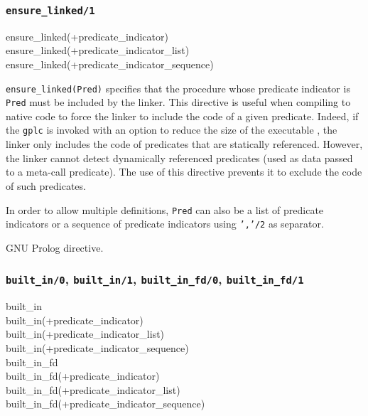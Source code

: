 \subsubsection{\texttt{ensure\_linked/1}}

\begin{TemplatesOneCol}
ensure\_linked(+predicate\_indicator)\\
ensure\_linked(+predicate\_indicator\_list)\\
ensure\_linked(+predicate\_indicator\_sequence)

\end{TemplatesOneCol}

\Description

\texttt{ensure\_linked(Pred)} specifies that the procedure
whose predicate indicator is \texttt{Pred} must be included by the linker.
This directive is useful when compiling to native code to force the linker to
include the code of a given predicate. Indeed, if the \texttt{gplc} is
invoked with an option to reduce the size of the executable
, the linker only includes the code of predicates
that are statically referenced. However, the linker cannot detect dynamically
referenced predicates (used as data passed to a meta-call predicate). The use
of this directive prevents it to exclude the code of such predicates.

In order to allow multiple definitions, \texttt{Pred} can also be a list of
predicate indicators or a sequence of predicate indicators using
\texttt{','/2} as separator.

\Portability

GNU Prolog directive.

\subsubsection{\texttt{built\_in/0},
               \texttt{built\_in/1},
               \texttt{built\_in\_fd/0},
               \texttt{built\_in\_fd/1}}

\begin{TemplatesOneCol}
built\_in\\
built\_in(+predicate\_indicator)\\
built\_in(+predicate\_indicator\_list)\\
built\_in(+predicate\_indicator\_sequence)\\
built\_in\_fd\\
built\_in\_fd(+predicate\_indicator)\\
built\_in\_fd(+predicate\_indicator\_list)\\
built\_in\_fd(+predicate\_indicator\_sequence)

\end{TemplatesOneCol}

